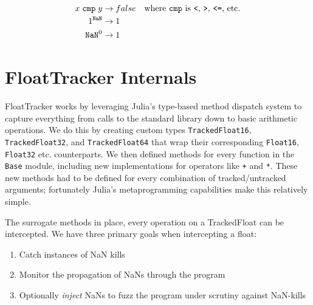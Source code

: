 \documentclass{juliacon}
\begin{document}

\begin{align*}
x \; \texttt{cmp} \; y &\rightarrow false &\text{where \texttt{cmp} is \texttt{<}, \texttt{>}, \texttt{<=}, etc.} \\
1^{\text{\texttt{NaN}}} &\rightarrow 1 \\
\text{\texttt{NaN}}^{0} &\rightarrow 1
\end{align*}



\section{FloatTracker Internals}

FloatTracker works by leveraging Julia's type-based method dispatch system to capture everything from calls to the standard library down to basic arithmetic operations.
We do this by creating custom types \texttt{TrackedFloat16}, \texttt{TrackedFloat32}, and \texttt{TrackedFloat64} that wrap their corresponding \texttt{Float16}, \texttt{Float32} etc. counterparts.
We then defined methods for every function in the \texttt{Base} module, including new implementations for operators like \texttt{+} and \texttt{*}.
These new methods had to be defined for every combination of tracked/untracked arguments;
fortunately Julia's metaprogramming capabilities make this relatively simple.

The surrogate methods in place, every operation on a TrackedFloat can be intercepted.
We have three primary goals when intercepting a float:

\begin{enumerate}
  \item Catch instances of NaN kills
  \item Monitor the propagation of NaNs through the program
  \item Optionally \emph{inject} NaNs to fuzz the program under scrutiny against NaN-kills
\end{enumerate}
\end{document}
